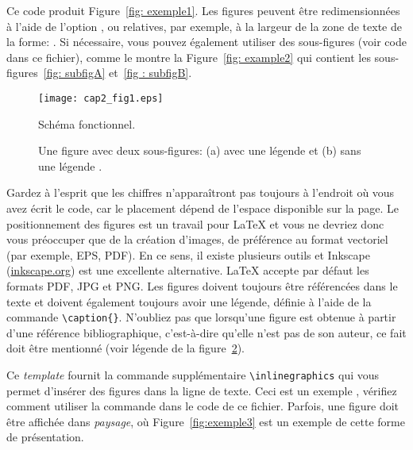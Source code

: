 Ce code produit Figure~\ref{fig: exemple1}. Les figures peuvent être redimensionnées à l'aide de l'option , ou relatives, par exemple, à la largeur de la zone de texte de la forme: . Si nécessaire, vous pouvez également utiliser des sous-figures (voir code dans ce fichier), comme le montre la Figure~\ref{fig: example2} qui contient les sous-figures~\ref{fig: subfigA} et~\ref{fig : subfigB}.

\begin{figure}[htbp]
    \center
    \texttt{[image: cap2\_fig1.eps]}
    \caption{Schéma fonctionnel.}
    \label{fig:exemple1}
\end{figure}

\begin{figure} [htbp]
  \center
  \caption[Une figure avec deux sous-figures.]{Une figure avec deux sous-figures: (a) avec une légende et (b) sans une légende \cite{Motorola96}.}
  \label{fig:exemple2}
\end{figure}

Gardez à l'esprit que les chiffres n'apparaîtront pas toujours à l'endroit où vous avez écrit le code, car le placement dépend de l'espace disponible sur la page. Le positionnement des figures est un travail pour \LaTeX{} et vous ne devriez donc vous préoccuper que de la création d'images, de préférence au format vectoriel (par exemple, EPS, PDF). En ce sens, il existe plusieurs outils et Inkscape (\url{inkscape.org}) est une excellente alternative. \LaTeX{} accepte par défaut les formats PDF, JPG et PNG. Les figures doivent toujours être référencées dans le texte et doivent également toujours avoir une légende, définie à l'aide de la commande \verb|\caption{}|. N'oubliez pas que lorsqu'une figure est obtenue à partir d'une référence bibliographique, c'est-à-dire qu'elle n'est pas de son auteur, ce fait doit être mentionné (voir légende de la figure~\ref{fig:exemple2}).

Ce \textit{template} fournit la commande supplémentaire \verb|\inlinegraphics| qui vous permet d'insérer des figures dans la ligne de texte. Ceci est un exemple , vérifiez comment utiliser la commande dans le code de ce fichier. Parfois, une figure doit être affichée dans \textit{paysage}, où Figure~\ref{fig:exemple3} est un exemple de cette forme de présentation.

